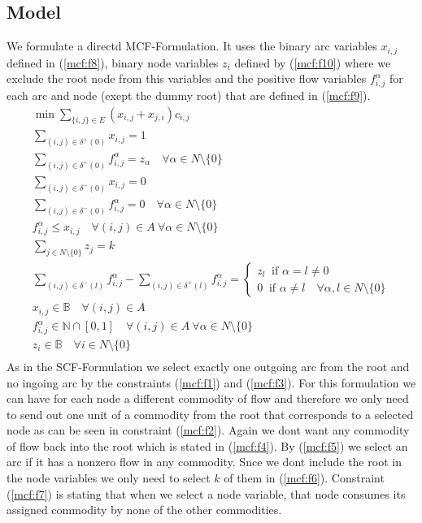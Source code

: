 \documentclass[11pt]{article}
\begin{document}
\subsection{Model}
We formulate a directd MCF-Formulation. It uses the binary arc variables $x_{i,j}$ defined in (\ref{mcf:f8}), binary node variables $z_i$ defined by (\ref{mcf:f10}) where we exclude the root node from this variables and the positive flow variables $f_{i,j}^\alpha$ for each arc and node (exept the dummy root) that are defined in (\ref{mcf:f9}). 
\begin{gather}
  \min\sum\limits_{\{i,j\}\in E}(x_{i,j}+ x_{j,i})c_{i,j} \label{mcf:f0}\\
  \sum\limits_{(i,j)\in \delta^+(0) } x_{i,j} =1 \label{mcf:f1}\\
  \sum\limits_{(i,j)\in \delta^+(0) } f_{i,j}^\alpha =z_\alpha \quad \forall \alpha\in N \setminus \{0\} \label{mcf:f2}\\
  \sum\limits_{(i,j)\in \delta^-(0) } x_{i,j} =0 \label{mcf:f3}\\
  \sum\limits_{(i,j)\in \delta^-(0) } f_{i,j}^\alpha =0 \quad \forall \alpha \in N \setminus \{0\} \label{mcf:f4}\\
  f_{i,j}^\alpha \leq x_{i,j} \quad \forall (i,j)\in A \ \forall \alpha \in N\setminus\{0\}\label{mcf:f5}\\
  \sum\limits_{j\in N\setminus \{0\}} z_j = k\label{mcf:f6}\\
  \sum\limits_{(i,j)\in \delta^-(l) } f_{i,j}^\alpha - \sum\limits_{(i,j)\in \delta^+(l) } f_{i,j}^\alpha = 
  \begin{cases} z_l \ \text{ if } \alpha = l \neq 0 \\ 0 \ \text{ if } \alpha \neq l \quad \forall \alpha, l \in N \setminus \{0\} \end{cases} \label{mcf:f7}\\
  x_{i,j} \in \mathbb{B} \quad \forall (i,j)\in A\label{mcf:f8}\\
  f_{i,j}^\alpha \in \mathbb{N}\cap[0,1] \quad \forall (i,j)\in A \ \forall \alpha \in N \setminus \{0\}\label{mcf:f9}\\
  z_{i} \in \mathbb{B} \quad \forall i \in N\setminus \{0\}\label{mcf:f10}\\
\end{gather}
As in the SCF-Formulation we select exactly one outgoing arc from the root and no ingoing arc by the constraints (\ref{mcf:f1}) and (\ref{mcf:f3}). For this formulation we can have for each node a different commodity of flow and therefore we only need to send out one unit of a commodity from the root that corresponds to a selected node as can be seen in constraint (\ref{mcf:f2}). Again we dont want any commodity of flow back into the root which is stated in (\ref{mcf:f4}).
By (\ref{mcf:f5}) we select an arc if it has a nonzero flow in any commodity. Snce we dont include the root in the node variables we only need to select $k$ of them in (\ref{mcf:f6}). Constraint (\ref{mcf:f7}) is stating that when we select a node variable, that node consumes its assigned commodity by none of the other commodities. 
\end{document}
